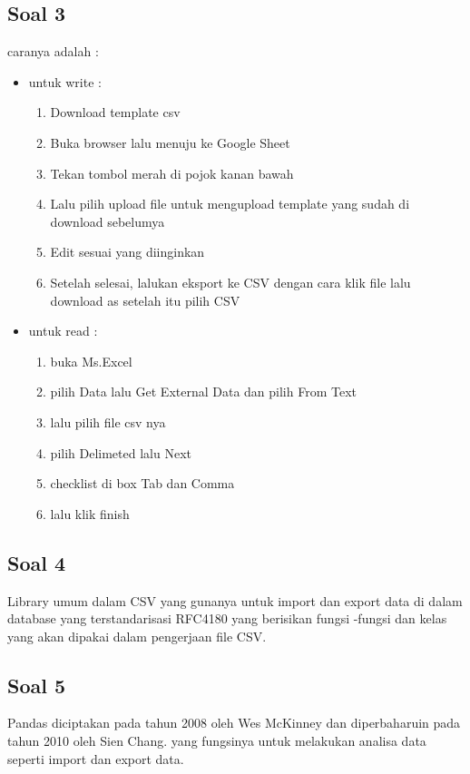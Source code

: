     \subsection{Soal 3}
    caranya adalah :
		\begin{itemize}
			\item untuk write :
			\begin{enumerate}
				\item Download template csv
				\item Buka browser lalu menuju ke Google Sheet
				\item Tekan tombol merah di pojok kanan bawah
				\item Lalu pilih upload file untuk mengupload template yang sudah di download sebelumya
				\item Edit sesuai yang diinginkan
				\item Setelah selesai, lalukan eksport ke CSV dengan cara klik file lalu download as setelah itu pilih CSV
			\end{enumerate}
			\item untuk read :
			\begin{enumerate}
				\item buka Ms.Excel
				\item pilih Data lalu Get External Data dan pilih From Text
				\item lalu pilih file csv nya
				\item pilih Delimeted lalu Next
				\item checklist di box Tab dan Comma
				\item lalu klik finish
			\end{enumerate}
		\end{itemize}

	\subsection{Soal 4}
	Library umum dalam CSV yang gunanya untuk import dan export data di dalam database yang terstandarisasi RFC4180 yang berisikan fungsi -fungsi dan kelas yang akan dipakai dalam pengerjaan file CSV.

	\subsection{Soal 5}
	Pandas diciptakan pada tahun 2008 oleh Wes McKinney dan diperbaharuin pada tahun 2010 oleh Sien Chang. yang fungsinya untuk melakukan analisa data seperti import dan export data.

